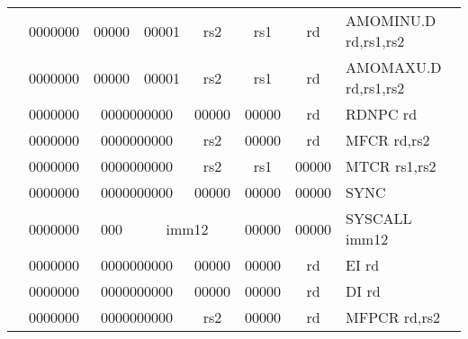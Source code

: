 \begin{table}[p]
\begin{small}
\begin{center}
\begin{tabular}{rcccccccccl}
&
\multicolumn{1}{|c|}{0000000} &
\multicolumn{3}{c|}{00000} &
\multicolumn{2}{c|}{00001} &
\multicolumn{1}{c|}{rs2} &
\multicolumn{1}{c|}{rs1} &
\multicolumn{1}{c|}{rd} & AMOMINU.D rd,rs1,rs2 \\
\cline{2-10}
  

&
\multicolumn{1}{|c|}{0000000} &
\multicolumn{3}{c|}{00000} &
\multicolumn{2}{c|}{00001} &
\multicolumn{1}{c|}{rs2} &
\multicolumn{1}{c|}{rs1} &
\multicolumn{1}{c|}{rd} & AMOMAXU.D rd,rs1,rs2 \\
\cline{2-10}
  

&
\multicolumn{1}{|c|}{0000000} &
\multicolumn{5}{c|}{0000000000} &
\multicolumn{1}{c|}{00000} &
\multicolumn{1}{c|}{00000} &
\multicolumn{1}{c|}{rd} & RDNPC rd \\
\cline{2-10}
  

&
\multicolumn{1}{|c|}{0000000} &
\multicolumn{5}{c|}{0000000000} &
\multicolumn{1}{c|}{rs2} &
\multicolumn{1}{c|}{00000} &
\multicolumn{1}{c|}{rd} & MFCR rd,rs2 \\
\cline{2-10}
  

&
\multicolumn{1}{|c|}{0000000} &
\multicolumn{5}{c|}{0000000000} &
\multicolumn{1}{c|}{rs2} &
\multicolumn{1}{c|}{rs1} &
\multicolumn{1}{c|}{00000} & MTCR rs1,rs2 \\
\cline{2-10}
  

&
\multicolumn{1}{|c|}{0000000} &
\multicolumn{5}{c|}{0000000000} &
\multicolumn{1}{c|}{00000} &
\multicolumn{1}{c|}{00000} &
\multicolumn{1}{c|}{00000} & SYNC  \\
\cline{2-10}
  

&
\multicolumn{1}{|c|}{0000000} &
\multicolumn{2}{c|}{000} &
\multicolumn{4}{c|}{imm12} &
\multicolumn{1}{c|}{00000} &
\multicolumn{1}{c|}{00000} & SYSCALL imm12 \\
\cline{2-10}
  

&
\multicolumn{1}{|c|}{0000000} &
\multicolumn{5}{c|}{0000000000} &
\multicolumn{1}{c|}{00000} &
\multicolumn{1}{c|}{00000} &
\multicolumn{1}{c|}{rd} & EI rd \\
\cline{2-10}
  

&
\multicolumn{1}{|c|}{0000000} &
\multicolumn{5}{c|}{0000000000} &
\multicolumn{1}{c|}{00000} &
\multicolumn{1}{c|}{00000} &
\multicolumn{1}{c|}{rd} & DI rd \\
\cline{2-10}
  

&
\multicolumn{1}{|c|}{0000000} &
\multicolumn{5}{c|}{0000000000} &
\multicolumn{1}{c|}{rs2} &
\multicolumn{1}{c|}{00000} &
\multicolumn{1}{c|}{rd} & MFPCR rd,rs2 \\
\cline{2-10}
  


\end{tabular}
\end{center}
\end{small}
\end{table}
